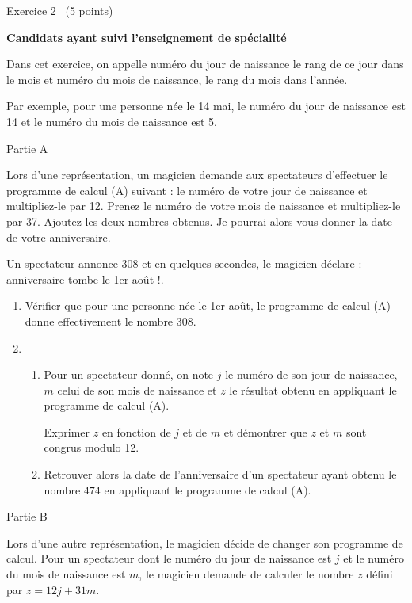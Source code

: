 
%
\begin{h2}Exercice 2  (5 points)\end{h2}
\textbf{Candidats ayant suivi l'enseignement de spécialité}
\par
Dans cet exercice, on appelle numéro du jour de naissance le rang de ce jour dans le mois et numéro du mois de naissance, le rang du mois dans l'année.
\par
Par exemple, pour une personne née le 14 mai, le numéro du jour de naissance est 14 et le numéro du mois de naissance est 5.
\begin{h3}Partie A\end{h3}
Lors d'une représentation, un magicien demande aux spectateurs d'effectuer le programme de calcul (A) suivant :
\ogPrenez le numéro de votre jour de naissance et multipliez-le par 12. Prenez le numéro de votre mois de naissance et multipliez-le par 37. Ajoutez les deux nombres obtenus. Je pourrai alors vous donner la date de votre anniversaire\fg{}.
\par
Un spectateur annonce 308 et en quelques secondes, le magicien déclare : \ogVotre anniversaire tombe le 1er août !\fg{}.
\begin{enumerate}
     \item
     Vérifier que pour une personne née le 1er août, le programme de calcul (A) donne effectivement le nombre $308$.
     \item
     \begin{enumerate}[label=\alph*.]
          \item
          Pour un spectateur donné, on note $j$ le numéro de son jour de naissance, $m$ celui de son mois de naissance et $z$ le résultat obtenu en appliquant le programme de calcul (A).
          \par
          Exprimer $z$ en fonction de $j$ et de $m$ et démontrer que $z$ et $m$ sont congrus modulo 12.
          \item
     Retrouver alors la date de l'anniversaire d'un spectateur ayant obtenu le nombre $474$ en appliquant le programme de calcul (A).\end{enumerate}
\end{enumerate}
\begin{h3}Partie B\end{h3}
Lors d'une autre représentation, le magicien décide de changer son programme de calcul. Pour un spectateur dont le numéro du jour de naissance est $j$ et le numéro du mois de naissance est $m$, le magicien demande de calculer le nombre $z$ défini par $z=12j+31m$.

